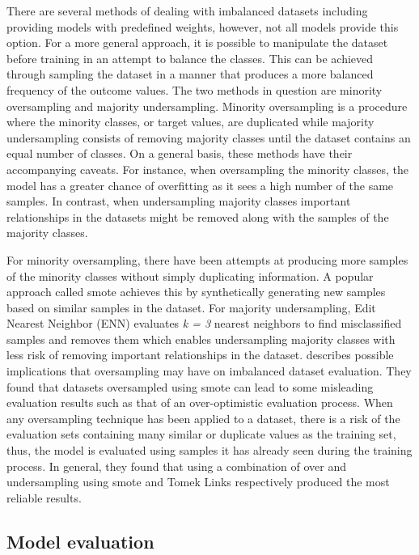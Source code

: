 There are several methods of dealing with imbalanced datasets including providing models with predefined weights, however, not all models provide this option. For a more general approach, it is possible to manipulate the dataset before training in an attempt to balance the classes. This can be achieved through sampling the dataset in a manner that produces a more balanced frequency of the outcome values. The two methods in question are minority oversampling and majority undersampling. Minority oversampling is a procedure where the minority classes, or target values, are duplicated while majority undersampling consists of removing majority classes until the dataset contains an equal number of classes. On a general basis, these methods have their accompanying caveats. For instance, when oversampling the minority classes, the model has a greater chance of overfitting as it sees a high number of the same samples. In contrast, when undersampling majority classes important relationships in the datasets might be removed along with the samples of the majority classes.

For minority oversampling, there have been attempts at producing more samples of the minority classes without simply duplicating information. A popular approach called \acrfull{smote} \parencite{Chawla2002} achieves this by synthetically generating new samples based on similar samples in the dataset. For majority undersampling, Edit Nearest Neighbor (ENN) evaluates \textit{k = 3} nearest neighbors to find misclassified samples and removes them which enables undersampling majority classes with less risk of removing important relationships in the dataset. \cite{cv_imbalance} describes possible implications that oversampling may have on imbalanced dataset evaluation. They found that datasets oversampled using \acrshort{smote} can lead to some misleading evaluation results such as that of an over-optimistic evaluation process. When any oversampling technique has been applied to a dataset, there is a risk of the evaluation sets containing many similar or duplicate values as the training set, thus, the model is evaluated using samples it has already seen during the training process. In general, they found that using a combination of over and undersampling using \acrshort{smote} and Tomek Links \parencite{tomek} respectively produced the most reliable results.

\subsection{Model evaluation}
\label{sec:model_evaluation}

